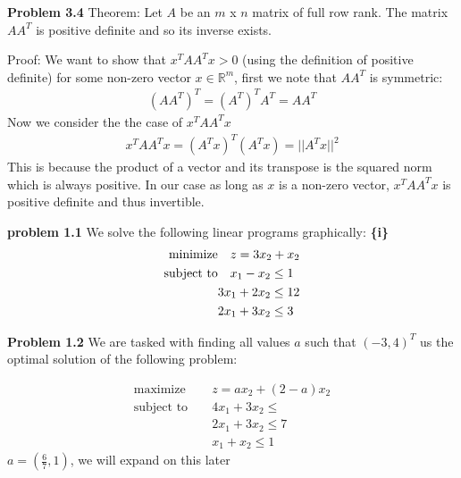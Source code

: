 \documentclass{article}
\begin{document}
\textbf{Problem 3.4} Theorem: Let $A$ be an $m$ x $n$ matrix of full row rank. The matrix $AA^T$ is positive definite and so its inverse exists. \newline 

    Proof: We want to show that $x^TAA^Tx > 0$ (using the definition of positive definite) for some non-zero vector $x \in \mathbb{R}^m$, first we note that $AA^T$ is symmetric:
\begin{align*}
    (AA^T)^T = (A^T)^TA^T = AA^T
\end{align*}
Now we consider the the case of $x^TAA^Tx$ 
\begin{align*}
    x^TAA^Tx = (A^Tx)^T(A^Tx) = ||A^Tx||^2
\end{align*}
    This is because the product of a vector and its transpose is the squared norm which is always positive. In our case as long as $x$ is a non-zero vector, $x^TAA^Tx$ is positive definite and thus invertible.

\textbf{problem 1.1} We solve the following linear programs graphically: \newline
\textbf{\{i\}}
    \begin{align*}
        \text{minimize} &\null \quad z = 3x_2 + x_2 \\ 
        \text{subject to} &\null \quad x_1 - x_2 \leq 1 \\
        & 3x_1 + 2x_2 \leq 12 \\
        & 2x_1 + 3x_2 \leq 3 \\
    \end{align*}

\textbf{Problem 1.2} We are tasked with finding all values $a$ such that $(-3,4)^T$ us the optimal solution of the following problem:

\begin{align*}
  \text{maximize } && z = ax_2 + (2-a)x_2 \\
  \text{subject to } && 4x_1 + 3x_2 \leq  \\
  && 2x_1 + 3x_2 \leq 7 \\ 
  && x_1 + x_2 \leq 1
\end{align*}
$a = (\frac{6}{7}, 1)$, we will expand on this later
\end{document}
